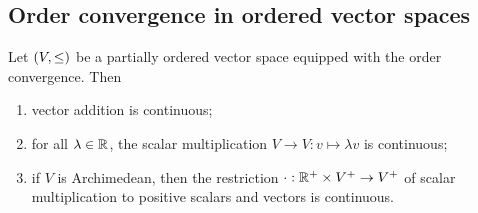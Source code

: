 \subsection{Order convergence in ordered vector spaces}
\begin{proposition} \label{continuityOrderConvergenceOrderedVectorSpaces}
Let $\sSet{V, \leq}$ be a partially ordered vector space equipped with the order convergence. Then
\begin{enumerate}
\item vector addition is continuous;
\item for all $\lambda\in \mathbb{R}$, the scalar multiplication $V\to V: v \mapsto \lambda v$ is continuous;
\item if $V$ is Archimedean, then the restriction $\cdot: \mathbb{R}^+ \times V^+ \to V^+$ of scalar multiplication to positive scalars and vectors is continuous.
\end{enumerate}
\end{proposition}
